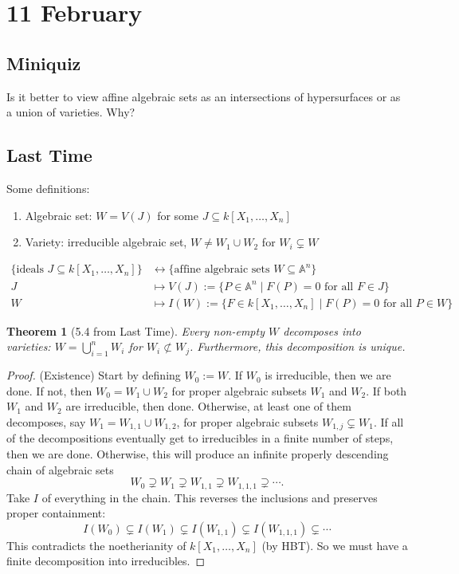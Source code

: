 \documentclass[12pt]{article}
\newtheorem{theorem}{Theorem}[section]
\theoremstyle{definition}
\begin{document}
\section{11 February}
\subsection{Miniquiz}
Is it better to view affine algebraic sets as an intersections of hypersurfaces or as a union of varieties. Why?
\subsection{Last Time}
Some definitions:
\begin{enumerate}
    \item Algebraic set: $W=V(J)$ for some $J\subseteq k[X_1,\dotsc,X_n]$
    \item Variety: irreducible algebraic set, $W\neq W_1\cup W_2$ for $W_i\subsetneq W$
\end{enumerate}
\begin{align*}
    \{\text{ideals }J\subseteq k[X_1,\dotsc,X_n]\}&\stackrel{}{\longleftrightarrow}\{\text{affine algebraic sets }W\subseteq\mathbb{A}^n\}\\
    J&\mapsto V(J):=\{P\in\mathbb{A}^n\mid F(P)=0\text{ for all }F\in J\}\\
    W&\mapsto I(W):=\{F\in k[X_1,\dotsc,X_n]\mid F(P)=0\text{ for all }P\in W\} 
\end{align*}
\begin{theorem}[5.4 from Last Time]
    Every non-empty $W$ decomposes into varieties: $W=\bigcup\limits_{i=1}^nW_i$ for $W_i\not\subset W_j$. Furthermore, this decomposition is unique.
\end{theorem}
\begin{proof}
    (Existence) Start by defining $W_0:=W$. If $W_0$ is irreducible, then we are done. If not, then $W_0=W_1\cup W_2$ for proper algebraic subsets $W_1$ and $W_2$. If both $W_1$ and $W_2$ are irreducible, then done. Otherwise, at least one of them decomposes, say $W_1=W_{1,1}\cup W_{1,2}$, for proper algebraic subsets $W_{1,j}\subsetneq W_1$. If all of the decompositions eventually get to irreducibles in a finite number of steps, then we are done. Otherwise, this will produce an infinite properly descending chain of algebraic sets
    \[W_0\supsetneq W_1\supsetneq W_{1,1}\supsetneq W_{1,1,1}\supsetneq\dotsb.\]
    Take $I$ of everything in the chain. This reverses the inclusions and preserves proper containment:
    \[I(W_0)\subsetneq I(W_1)\subsetneq I(W_{1,1})\subsetneq I(W_{1,1,1})\subsetneq\dotsb\]
    This contradicts the noetherianity of $k[X_1,\dotsc,X_n]$ (by HBT). So we must have a finite decomposition into irreducibles.
\end{proof}
\end{document}
